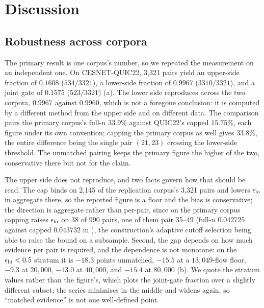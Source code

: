 \section{Discussion}
\label{sec:discussion}

\subsection{Robustness across corpora}
\label{sec:discussion/robustness}

The primary result is one corpus's number, so we repeated the measurement on an
independent one. On CESNET-QUIC22, 3,321 pairs yield an upper-side fraction of
$0.1608$ ($534/3321$), a lower-side fraction of $0.9967$ ($3310/3321$), and a
joint gate of $0.1575$ ($523/3321$) (a). The lower side
reproduces across the two corpora, $0.9967$ against $0.9960$, which is not a
foregone conclusion: it is computed by a different method from the upper side and
on different data. The comparison pairs the primary corpus's full-$n$ $33.9\%$
against QUIC22's capped $15.75\%$, each figure under its own convention; capping
the primary corpus as well gives $33.8\%$, the entire difference being the single
pair $(21,23)$ crossing the lower-side threshold. The unmatched pairing keeps the
primary figure the higher of the two, conservative there but not for the claim.

The upper side does not reproduce, and two facts govern how that should be read.
The cap binds on 2{,}145 of the replication corpus's 3{,}321 pairs and lowers
$\epsilon_{\mathrm{lo}}$ in aggregate there, so the reported figure is a floor and the bias is
conservative; the direction is aggregate rather than per-pair, since on the
primary corpus capping raises $\epsilon_{\mathrm{lo}}$ on 38 of 990 pairs, one of them pair
35--49 (full-$n$ $0.042725$ against capped $0.043732$ in ),
the construction's adaptive cutoff selection being able to raise the bound on a
subsample. Second, the gap depends on how much evidence per pair is required, and
the dependence is not monotone: on the $\epsilon_{\mathrm{hi}} < 0.5$ stratum it is $-18.3$
points unmatched, $-15.5$ at a $13{,}049$-flow floor, $-9.3$ at $20{,}000$,
$-13.0$ at $40{,}000$, and $-15.4$ at $80{,}000$
(b). We quote the stratum values rather than the figure's,
which plots the joint-gate fraction over a slightly different subset; the series
minimises in the middle and widens again, so ``matched evidence'' is not one
well-defined point.

